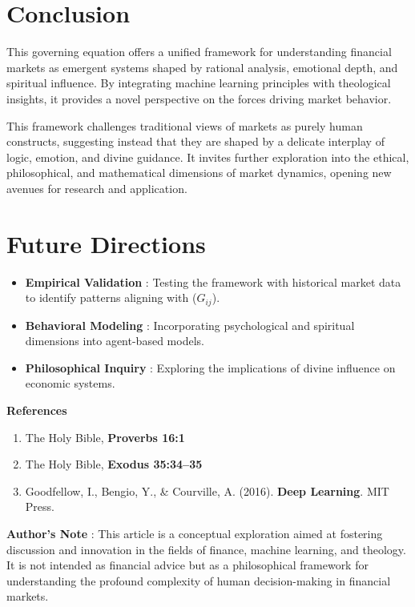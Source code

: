 \documentclass[a4]{article}
\newcommand{\bn}{\bigskip\noindent}
\begin{document}
\section{Conclusion}

This governing equation offers a unified framework for understanding financial markets as emergent systems shaped by rational analysis, emotional depth, and spiritual influence. By integrating machine learning principles with theological insights, it provides a novel perspective on the forces driving market behavior.

\bn
This framework challenges traditional views of markets as purely human constructs, suggesting instead that they are shaped by a delicate interplay of logic, emotion, and divine guidance. It invites further exploration into the ethical, philosophical, and mathematical dimensions of market dynamics, opening new avenues for research and application.



\section{Future Directions}

\begin{itemize}
\item  {\bf Empirical Validation} : Testing the framework with historical market data to identify patterns aligning with ($G_{ij}$).
\item {\bf Behavioral Modeling} : Incorporating psychological and spiritual dimensions into agent-based models.
\item {\bf Philosophical Inquiry} : Exploring the implications of divine influence on economic systems.
\end{itemize}

\bn
{\bf References} 
\begin{enumerate}
\item The Holy Bible, {\bf Proverbs 16:1}   
\item The Holy Bible, {\bf Exodus 35:34--35}   
\item Goodfellow, I., Bengio, Y., \& Courville, A. (2016). {\bf Deep Learning}. MIT Press.  
\end{enumerate}

\bn
{\bf Author's Note} :  
This article is a conceptual exploration aimed at fostering discussion and innovation in the fields of finance, machine learning, and theology. It is not intended as financial advice but as a philosophical framework for understanding the profound complexity of human decision-making in financial markets.
\end{document}

